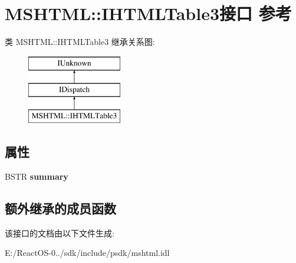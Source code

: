\hypertarget{interface_m_s_h_t_m_l_1_1_i_h_t_m_l_table3}{}\section{M\+S\+H\+T\+ML\+:\+:I\+H\+T\+M\+L\+Table3接口 参考}
\label{interface_m_s_h_t_m_l_1_1_i_h_t_m_l_table3}
类 M\+S\+H\+T\+ML\+:\+:I\+H\+T\+M\+L\+Table3 继承关系图\+:\begin{figure}[H]
\begin{center}
\leavevmode
\includegraphics[height=3.000000cm]{interface_m_s_h_t_m_l_1_1_i_h_t_m_l_table3}
\end{center}
\end{figure}
\subsection*{属性}
\begin{DoxyCompactItemize}
\item 
\mbox{\label{interface_m_s_h_t_m_l_1_1_i_h_t_m_l_table3_a5c9547729690e314e82775645ce8b198}} 
B\+S\+TR {\bfseries summary}
\end{DoxyCompactItemize}
\subsection*{额外继承的成员函数}


该接口的文档由以下文件生成\+:\begin{DoxyCompactItemize}
\item 
E\+:/\+React\+O\+S-\/0../sdk/include/psdk/mshtml.\+idl\end{DoxyCompactItemize}
